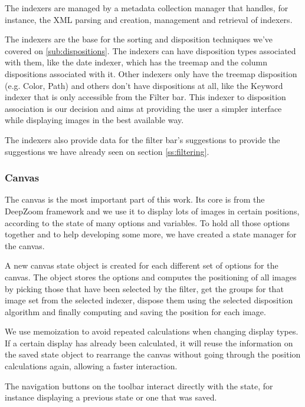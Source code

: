 The indexers are managed by a metadata collection manager that handles, for instance, the XML parsing and creation, management and retrieval of indexers.

The indexers are the base for the sorting and disposition techniques we've covered on \ref{sub:dispositions}. The indexers can have disposition types associated with them, like the date indexer, which has the treemap and the column dispositions associated with it. Other indexers only have the treemap disposition (e.g. Color, Path) and others don't have dispositions at all, like the Keyword indexer that is only accessible from the Filter bar. This indexer to disposition association is our decision and aims at providing the user a simpler interface while displaying images in the best available way.

The indexers also provide data for the filter bar's suggestions to provide the suggestions we have already seen on section \ref{ss:filtering}. 


\subsubsection{Canvas}

The canvas is the most important part of this work. Its core is from the DeepZoom framework and we use it to display lots of images in certain positions, according to the state of many options and variables. To hold all those options together and to help developing some more, we have created a state manager for the canvas.

A new canvas state object is created for each different set of options for the canvas. The object stores the options and computes the positioning of all images by picking those that have been selected by the filter, get the groups for that image set from the selected indexer, dispose them using the selected disposition algorithm and finally computing and saving the position for each image.

We use memoization to avoid repeated calculations when changing display types. If a certain display has already been calculated, it will reuse the information on the saved state object to rearrange the canvas without going through the position calculations again, allowing a faster interaction.

The navigation buttons on the toolbar interact directly with the state, for instance displaying a previous state or one that was saved.


